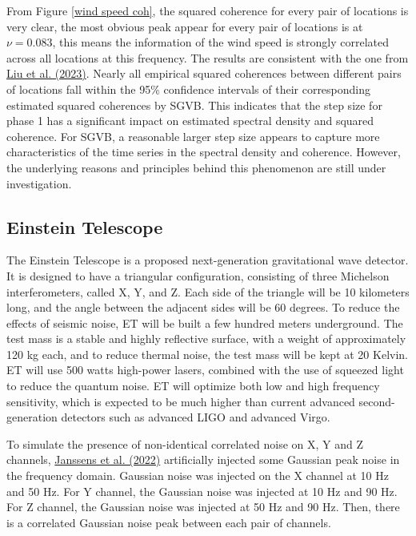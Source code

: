 \documentclass[12pt,a4paper]{article}
\begin{document}
From Figure \ref{wind speed coh}, the squared coherence for every pair of locations is very clear, the most obvious peak appear for every pair of locations is at $\nu=0.083$, this means the information of the wind speed is strongly correlated across all locations at this frequency. The results are consistent with the one from  \hyperref[liu 2023]{Liu et al. (2023)}. Nearly all empirical squared coherences between different pairs of locations fall within the 95\% confidence intervals of their corresponding estimated squared coherences by SGVB. This indicates that the step size for phase 1 has a significant impact on estimated spectral density and squared coherence. For SGVB, a reasonable larger step size appears to capture more characteristics of the time series in the spectral density and coherence. However, the underlying reasons and principles behind this phenomenon are still under investigation.






\subsection{Einstein Telescope}
The Einstein Telescope is a proposed next-generation gravitational wave detector. It is designed to have a triangular configuration, consisting of three Michelson interferometers, called X, Y, and Z. Each side of the triangle will be 10 kilometers long, and the angle between the adjacent sides will be 60 degrees. To reduce the effects of seismic noise, ET will be built a few hundred meters underground. The test mass is a stable and highly reflective surface, with a weight of approximately 120 kg each, and to reduce thermal noise, the test mass will be kept at 20 Kelvin. ET will use 500 watts high-power lasers, combined with the use of squeezed light to reduce the quantum noise. ET will optimize both low and high frequency sensitivity, which is expected to be much higher than current advanced second-generation detectors such as advanced LIGO and advanced Virgo.

To simulate the presence of non-identical correlated noise on X, Y and Z channels, \hyperref[janssens2022]{Janssens et al. (2022)} artificially injected some Gaussian peak noise in the frequency domain. Gaussian noise was injected on the X channel at 10 Hz and 50 Hz. For Y channel, the Gaussian noise was injected at 10 Hz and 90 Hz. For Z channel, the Gaussian noise was injected at 50 Hz and 90 Hz. Then, there is a correlated Gaussian noise peak between each pair of channels.
\end{document}
